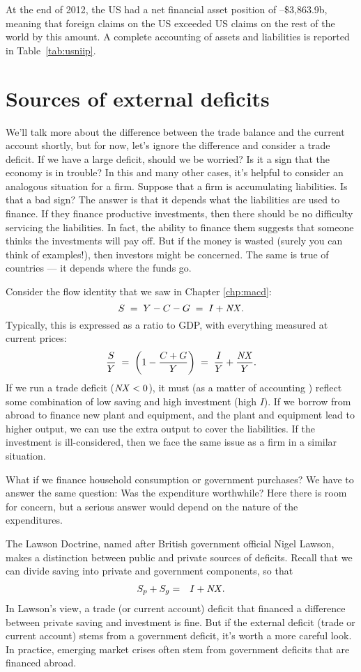 At the end of 2012, the US had a net financial asset position of
--\$3,863.9b, meaning that foreign claims on the US exceeded US claims
on the rest of the world by this amount.  A complete accounting
 of assets and liabilities is reported in Table~\ref{tab:usniip}.


\section{Sources of external deficits}
We'll talk more about the difference between the trade balance and
the current account shortly,
but for now, let's ignore the difference and consider a trade deficit.
If we have a large deficit, should we be worried?
Is it a sign that the economy is in trouble?
In this and many other cases, it's helpful to consider an analogous situation
for a firm.
Suppose that a firm is accumulating liabilities.
Is that a bad sign?
The answer is that it depends what the liabilities are used to finance.
If they finance productive investments,
then there should be no difficulty servicing the liabilities.
In fact, the ability to finance them suggests that someone
thinks the investments will pay off.
But if the money is wasted (surely you can think of examples!),
then investors might be concerned.
The same is true of countries --- it depends where the funds go.

Consider the flow identity that we saw in Chapter \ref{chp:macd}:
\[
    S  \;=\; Y - C - G \;=\; I + \mbox{\em NX\/}.
\]
Typically, this is expressed as a ratio to GDP,
with everything measured at current prices:
\[
    \frac{S}{Y}  \;=\; \left( 1 - \frac{C+G}{Y} \right)
        \;=\; \frac{I}{Y} + \frac{\mbox{\em NX\/}}{Y}.
\]
If we run a trade deficit ($\mbox{\em NX\/} < 0$),
it must (as a matter of accounting )
reflect some combination of low saving
and high investment (high $I$).
If we borrow from abroad to
finance new plant and equipment, and the plant and equipment lead to
higher output, we can use the extra output to cover the liabilities.
If the investment is ill-considered, then we face the same issue
as a firm in a similar situation.

What if we finance household consumption
or government purchases?
We have to answer the same question:  Was the
expenditure worthwhile?  Here there is room for concern,
but a serious answer would depend on the nature of the expenditures.

The Lawson Doctrine, named after British government official Nigel Lawson,
makes a distinction between public and private sources of deficits.
Recall that we can divide saving into private  and government components,
so that
\begin{eqnarray*}
    S_p + S_g  &=& I + \mbox{\em NX\/}.
\end{eqnarray*}
In Lawson's view, a trade (or current account) deficit that financed
a difference between private saving and investment
is fine.
But if the external deficit (trade or current account)
stems from a government deficit,
it's worth a more careful look.
In practice, emerging market crises often stem from government
deficits that are financed abroad.


